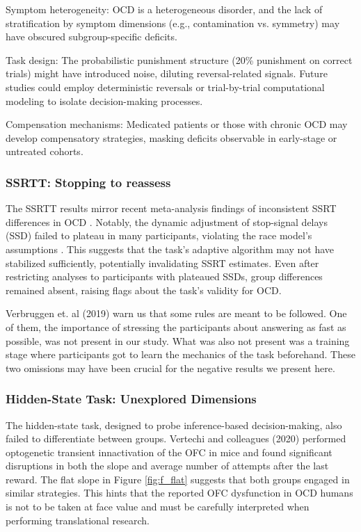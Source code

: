 \documentclass[11pt]{article}
\begin{document}
    Symptom heterogeneity: OCD is a heterogeneous disorder, and the lack of stratification by symptom dimensions (e.g., contamination vs. symmetry) may have obscured subgroup-specific deficits.

    Task design: The probabilistic punishment structure (20\% punishment on correct trials) might have introduced noise, diluting reversal-related signals. Future studies could employ deterministic reversals or trial-by-trial computational modeling to isolate decision-making processes.

    Compensation mechanisms: Medicated patients or those with chronic OCD may develop compensatory strategies, masking deficits observable in early-stage or untreated cohorts.

\subsubsection{SSRTT: Stopping to reassess}

The SSRTT results mirror recent meta-analysis findings of inconsistent SSRT differences in OCD \cite{mar2022obsessive}. Notably, the dynamic adjustment of stop-signal delays (SSD) failed to plateau in many participants, violating the race model’s assumptions \cite{verbruggen2019consensus}. This suggests that the task’s adaptive algorithm may not have stabilized sufficiently, potentially invalidating SSRT estimates. Even after restricting analyses to participants with plateaued SSDs, group differences remained absent, raising flags about the task’s validity for OCD.

Verbruggen et. al (2019) warn us that some rules are meant to be followed. One of them, the importance of stressing the participants about answering as fast as possible, was not present in our study. What was also not present was a training stage where participants got to learn the mechanics of the task beforehand. These two omissions may have been crucial for the negative results we present here.

\subsubsection{Hidden-State Task: Unexplored Dimensions}

The hidden-state task, designed to probe inference-based decision-making, also failed to differentiate between groups.  Vertechi and colleagues (2020) performed optogenetic transient innactivation of the OFC in mice and found significant disruptions in both the slope and average number of attempts after the last reward. The flat slope in Figure \ref{fig:f_flat} suggests that both groups engaged in similar strategies. This hints that the reported OFC dysfunction in OCD humans is not to be taken at face value and must be carefully interpreted when performing translational research.
\end{document}

